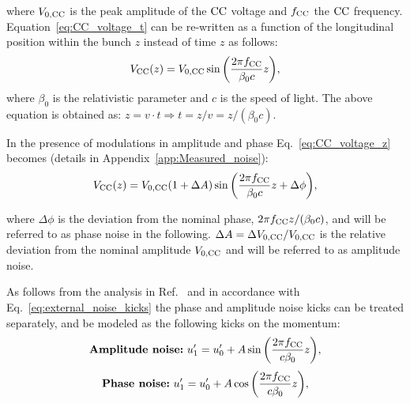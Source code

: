 where ${V_\mathrm{0, CC}}$ is the peak amplitude of the ${\mathrm{CC}}$ voltage and ${f_\mathrm{CC}}$ the ${\mathrm{CC}}$ frequency. Equation~\eqref{eq:CC_voltage_t} can be re-written as a function of the longitudinal position within the bunch $z$ instead of time $z$ as follows:
\begin{equation}\label{eq:CC_voltage_z}
    V_\mathrm{CC}(z) = {V_\mathrm{0, CC}} \sin{\left ( \frac{2\pi {f_\mathrm{CC}}}{\beta_0 c}z \right )},
\end{equation}
where $\beta_0$ is the relativistic parameter and $c$ is the speed of light. The above equation is obtained as: $z=v \cdot t \Rightarrow t=z/v=z/(\beta_0 c)$.



In the presence of modulations in amplitude and phase Eq.~\eqref{eq:CC_voltage_z} becomes (details in Appendix~\ref{app:Measured_noise}):
\begin{equation}\label{eq:CC_voltage_z}
    V_\mathrm{CC}(z) = {V_\mathrm{0, CC}} (1+\Delta A) \sin{\left ( \frac{2\pi {f_\mathrm{CC}}}{\beta_0 c}z + \Delta \phi \right )},
\end{equation}

where $\Delta \phi$ is the deviation from the nominal phase, $2\pi {f_\mathrm{CC}} z/(\beta_0 c)$, and will be referred to as phase noise in the following. $\Delta A = \Delta {V_\mathrm{0, CC}} / {V_\mathrm{0, CC}}$ is the relative deviation from the nominal amplitude ${V_\mathrm{0, CC}}$ and will be referred to as amplitude noise.



As follows from the analysis in Ref.~\cite{PhysRevSTAB.18.101001} and in accordance with Eq.~\eqref{eq:external_noise_kicks} the phase and amplitude noise kicks can be treated separately, and be modeled as the following kicks on the momentum: %
\begin{equation}\label{eq:amplitude_noise_kick}
  \textbf{\textrm{Amplitude noise:}} \  u^\prime_1 =  u^\prime_0 + A \sin{\left (  \frac{2 \pi {f_\mathrm{CC}}}{c \beta_0}z   \right )},
\end{equation}
\begin{equation}\label{eq:phase_noise_kick}
    \textbf{\textrm{Phase noise:}} \ u^\prime_1 =  u^\prime_0 + A \cos{\left (  \frac{2 \pi {f_\mathrm{CC}}}{c \beta_0}z   \right )},
\end{equation}

